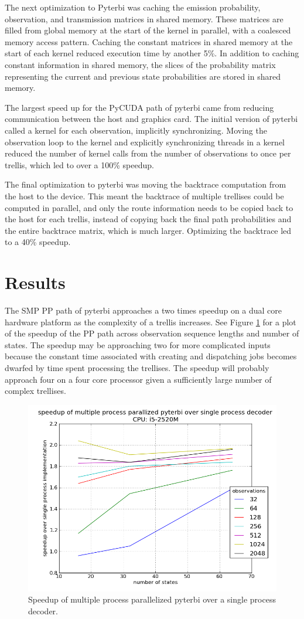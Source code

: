 \documentclass[journal,onecolumn]{IEEEtran}
\begin{document}
The next optimization to Pyterbi was caching the emission probability, observation, and transmission matrices in shared memory. These matrices are filled from global memory at the start of the kernel in parallel, with a coalesced memory access pattern. Caching the constant matrices in shared memory at the start of each kernel reduced execution time by another 5\%. In addition to caching constant information in shared memory, the slices of the probability matrix representing the current and previous state probabilities are stored in shared memory.

The largest speed up for the PyCUDA path of pyterbi came from reducing communication between the host and graphics card. The initial version of pyterbi called a kernel for each observation, implicitly synchronizing. Moving the observation loop to the kernel and explicitly synchronizing threads in a kernel reduced the number of kernel calls from the number of observations to once per trellis, which led to over a 100\% speedup.

The final optimization to pyterbi was moving the backtrace computation from the host to the device. This meant the backtrace of multiple trellises could be computed in parallel, and only the route information needs to be copied back to the host for each trellis, instead of copying back the final path probabilities and the entire backtrace matrix, which is much larger. Optimizing the backtrace led to a 40\% speedup.

\section{Results}
The SMP PP path of pyterbi approaches a two times speedup on a dual core hardware platform as the complexity of a trellis increases. See Figure \ref{fig_rhost} for a plot of the speedup of the PP path across observation sequence lengths and number of states. The speedup may be approaching two for more complicated inputs because the constant time associated with creating and dispatching jobs becomes dwarfed by time spent processing the trellises. The speedup will probably approach four on a four core processor given a sufficiently large number of complex trellises.

\begin{figure}[!t]
    \centering
    \includegraphics[width=.5 \linewidth]{figures/speedupgraphhost.png}
    \caption{Speedup of multiple process parallelized pyterbi over a single process decoder.}
    \label{fig_rhost}
\end{figure}
\end{document}
